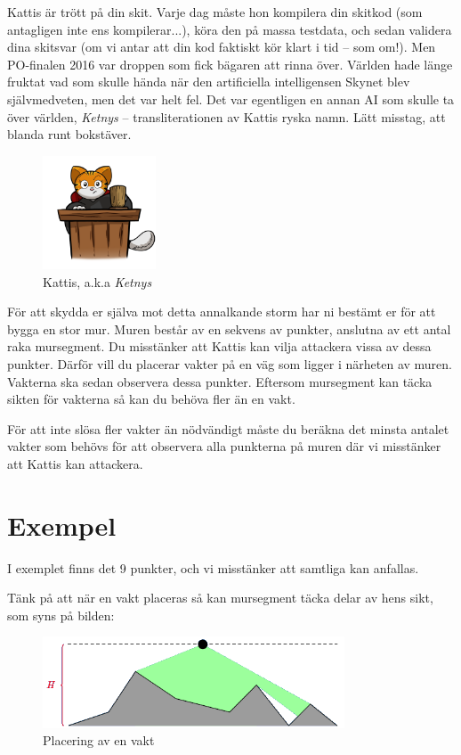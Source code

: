 \newcommand\version{v1}
Kattis är trött på din skit.
Varje dag måste hon kompilera din skitkod (som antagligen inte ens kompilerar...), köra den på massa testdata, och sedan validera dina skitsvar (om vi antar att din kod faktiskt kör klart i tid -- som om!).
Men PO-finalen 2016 var droppen som fick bägaren att rinna över.
Världen hade länge fruktat vad som skulle hända när den artificiella intelligensen Skynet blev självmedveten, men det var helt fel. Det var egentligen en annan AI som skulle ta över världen, \emph{Ketnys} -- transliterationen av Kattis ryska namn. Lätt misstag, att blanda runt bokstäver.

\begin{figure}[h!]
  \centering
  \includegraphics[width=0.3\textwidth]{kattis.png}
  \caption{Kattis, a.k.a \emph{Ketnys}}
\end{figure}

För att skydda er själva mot detta annalkande storm har ni bestämt er för att bygga en stor mur. Muren består av en sekvens av punkter, anslutna av ett antal raka mursegment.
Du misstänker att Kattis kan vilja attackera vissa av dessa punkter. Därför vill du placerar vakter på en väg som ligger i närheten av muren. Vakterna ska sedan observera dessa punkter.
Eftersom mursegment kan täcka sikten för vakterna så kan du behöva fler än en vakt.

För att inte slösa fler vakter än nödvändigt måste du beräkna det minsta antalet vakter som behövs för att observera alla punkterna på muren där vi misstänker att Kattis kan attackera.

\section*{Exempel}
I exemplet finns det 9 punkter, och vi misstänker att samtliga kan anfallas.

Tänk på att när en vakt placeras så kan mursegment täcka delar av hens sikt, som syns på bilden:
\begin{figure}[h!]
  \centering
  \includegraphics[width=0.8\textwidth]{imw.png}
  \caption{Placering av en vakt}
\end{figure}

